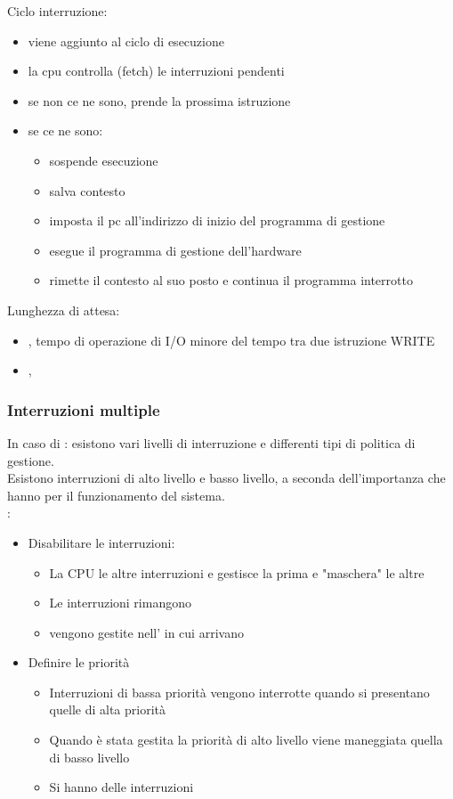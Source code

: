 \documentclass[12pt, a4paper]{article}
\begin{document}
Ciclo interruzione:
\begin{itemize}
	\item viene aggiunto al ciclo di esecuzione
	\item la cpu controlla (fetch) le interruzioni pendenti
	\item se non ce ne sono, prende la prossima istruzione
	\item se ce ne sono: 
	\begin{itemize}
		\item sospende esecuzione
		\item salva contesto
		\item imposta il pc all'indirizzo di inizio del 
			programma di gestione
		\item esegue il programma di gestione dell'hardware
		\item rimette il contesto al suo posto e continua 
			il programma interrotto
	\end{itemize}
\end{itemize}
Lunghezza di attesa:

\begin{itemize}
	\item {}, tempo di operazione di I/O minore del
		tempo tra due istruzione WRITE
	\item {}, 
\end{itemize}

\subsubsection{Interruzioni multiple}
In caso di : esistono vari livelli di interruzione e 
differenti tipi di politica di gestione.\\
Esistono interruzioni di alto livello e basso livello, a seconda dell'importanza
che hanno per il funzionamento del sistema.\\
:

\begin{itemize}
	\item Disabilitare le interruzioni:
		\begin{itemize}
			\item La CPU  le altre interruzioni e
				gestisce la prima e "maschera" le altre
			\item Le interruzioni rimangono 
			\item vengono gestite nell' in cui arrivano
		\end{itemize}
	\item Definire le priorità
		\begin{itemize}
			\item Interruzioni di bassa priorità vengono
				interrotte quando si presentano quelle di 
				alta priorità
			\item Quando è stata gestita la priorità di 
				alto livello viene maneggiata
				quella di basso livello
			\item Si hanno delle interruzioni 
		\end{itemize}
\end{itemize}
\end{document}
